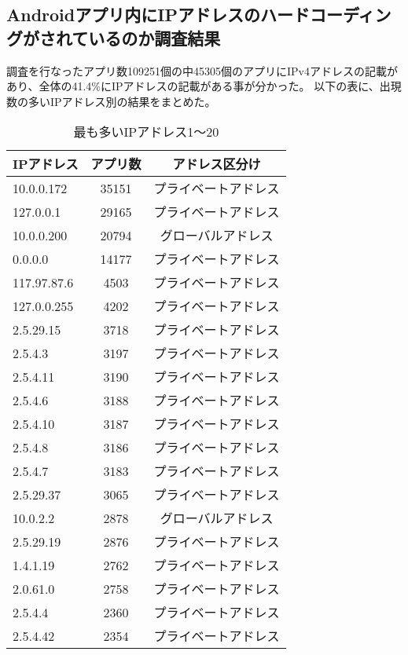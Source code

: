 \documentclass[a4j]{jarticle}
\begin{document}
\subsection{Androidアプリ内にIPアドレスのハードコーディングがされているのか調査結果}
調査を行なったアプリ数109251個の中45305個のアプリにIPv4アドレスの記載があり、全体の41.4\%にIPアドレスの記載がある事が分かった。
以下の表に、出現数の多いIPアドレス別の結果をまとめた。
\begin{table}[htb]
  \begin{center}
    \caption{最も多いIPアドレス1〜20}
    \begin{tabular}{|l|c|c|} \hline
      IPアドレス & アプリ数 & アドレス区分け\\ \hline \hline
10.0.0.172 & 35151 &プライベートアドレス\\ \hline
127.0.0.1 & 29165　& プライベートアドレス\\ \hline
10.0.0.200 & 20794 & グローバルアドレス\\ \hline
0.0.0.0 & 14177 & プライベートアドレス\\ \hline
117.97.87.6 & 4503 & プライベートアドレス\\ \hline
127.0.0.255 & 4202 & プライベートアドレス\\ \hline
2.5.29.15 & 3718 & プライベートアドレス\\ \hline
2.5.4.3 & 3197 & プライベートアドレス\\ \hline
2.5.4.11 & 3190& プライベートアドレス \\ \hline
2.5.4.6 & 3188 & プライベートアドレス\\ \hline
2.5.4.10 & 3187 & プライベートアドレス\\ \hline
2.5.4.8 & 3186 & プライベートアドレス\\ \hline
2.5.4.7 & 3183 & プライベートアドレス\\ \hline
2.5.29.37 & 3065 & プライベートアドレス\\ \hline
10.0.2.2 & 2878 & グローバルアドレス\\ \hline
2.5.29.19 & 2876& プライベートアドレス \\ \hline
1.4.1.19 & 2762 & プライベートアドレス\\ \hline
2.0.61.0 & 2758 & プライベートアドレス\\ \hline
2.5.4.4 & 2360 & プライベートアドレス\\ \hline
2.5.4.42 & 2354 & プライベートアドレス\\ \hline

    \end{tabular}
    \label{tab:price}
  \end{center}
\end{table}
\end{document}
